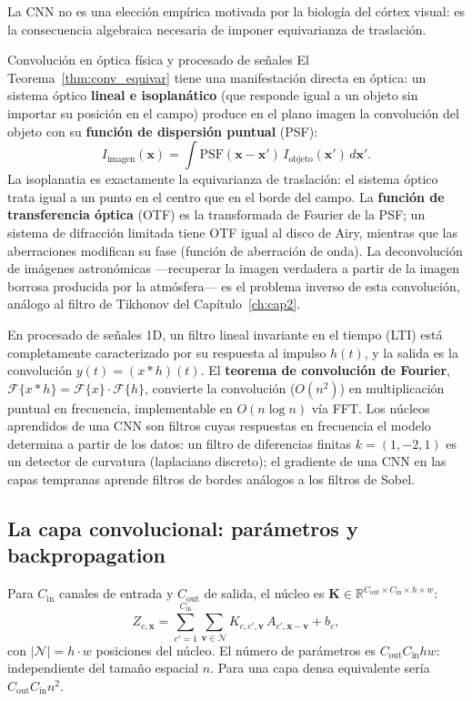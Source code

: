 La CNN no es una elección empírica motivada por la biología del córtex visual:
es la consecuencia algebraica necesaria de imponer equivarianza de traslación.

\begin{fisicaconexion}{Convolución en óptica física y procesado de señales}
El Teorema~\ref{thm:conv_equivar} tiene una manifestación directa en óptica: un
sistema óptico \textbf{lineal e isoplanático} (que responde igual a un objeto
sin importar su posición en el campo) produce en el plano imagen la convolución
del objeto con su \textbf{función de dispersión puntual} (PSF):
\[
  I_{\text{imagen}}(\bm{x})
  = \int \mathrm{PSF}(\bm{x}-\bm{x}')\,I_{\text{objeto}}(\bm{x}')\,d\bm{x}'.
\]
La isoplanatia es exactamente la equivarianza de traslación: el sistema óptico
trata igual a un punto en el centro que en el borde del campo. La
\textbf{función de transferencia óptica} (OTF) es la transformada de Fourier de
la PSF; un sistema de difracción limitada tiene OTF igual al disco de Airy,
mientras que las aberraciones modifican su fase (función de aberración de onda).
La deconvolución de imágenes astronómicas —recuperar la imagen verdadera a
partir de la imagen borrosa producida por la atmósfera— es el problema inverso
de esta convolución, análogo al filtro de Tikhonov del Capítulo~\ref{ch:cap2}.

En procesado de señales 1D, un filtro lineal invariante en el tiempo (LTI) está
completamente caracterizado por su respuesta al impulso $h(t)$, y la salida es
la convolución $y(t) = (x * h)(t)$. El \textbf{teorema de convolución de
Fourier}, $\mathcal{F}\{x*h\} = \mathcal{F}\{x\}\cdot\mathcal{F}\{h\}$,
convierte la convolución ($O(n^2)$) en multiplicación puntual en frecuencia,
implementable en $O(n\log n)$ vía FFT. Los núcleos aprendidos de una CNN son
filtros cuyas respuestas en frecuencia el modelo determina a partir de los datos:
un filtro de diferencias finitas $k = (1,-2,1)$ es un detector de curvatura
(laplaciano discreto); el gradiente de una CNN en las capas tempranas aprende
filtros de bordes análogos a los filtros de Sobel.
\end{fisicaconexion}

\subsection{La capa convolucional: parámetros y backpropagation}
\label{subsec:capa_conv}

Para $C_{\mathrm{in}}$ canales de entrada y $C_{\mathrm{out}}$ de salida, el
núcleo es $\bm{K} \in \mathbb{R}^{C_{\mathrm{out}} \times C_{\mathrm{in}}
\times h \times w}$:
\[
  Z_{c,\bm{x}} = \sum_{c'=1}^{C_{\mathrm{in}}}
  \sum_{\bm{v} \in \mathcal{N}} K_{c,c',\bm{v}}\,A_{c',\bm{x}-\bm{v}} + b_c,
\]
con $|\mathcal{N}| = h \cdot w$ posiciones del núcleo. El número de parámetros
es $C_{\mathrm{out}} C_{\mathrm{in}} h w$: independiente del tamaño espacial $n$.
Para una capa densa equivalente sería $C_{\mathrm{out}} C_{\mathrm{in}} n^2$.

